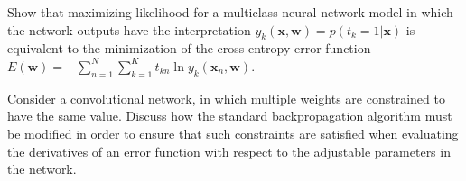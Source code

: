 \documentclass[a4 paper]{article}
\begin{document}

 Show that maximizing likelihood for a multiclass neural network model in which the network outputs have the interpretation $y_k(\mathbf{x}, \mathbf{w}) = p(t_k = 1|\mathbf{x})$ is equivalent to the minimization of the cross-entropy error function $E(\mathbf{w})=-\sum_{n=1}^{N} \sum_{k=1}^{K} t_{k n} \ln y_{k}\left(\mathbf{x}_{n}, \mathbf{w}\right)$.


 Consider a convolutional network, in which multiple weights are constrained to have the same value. Discuss how the standard backpropagation algorithm must be modified in order to ensure that such constraints are satisfied when evaluating the derivatives of an error function with respect to the adjustable parameters in the network.

\end{document}
